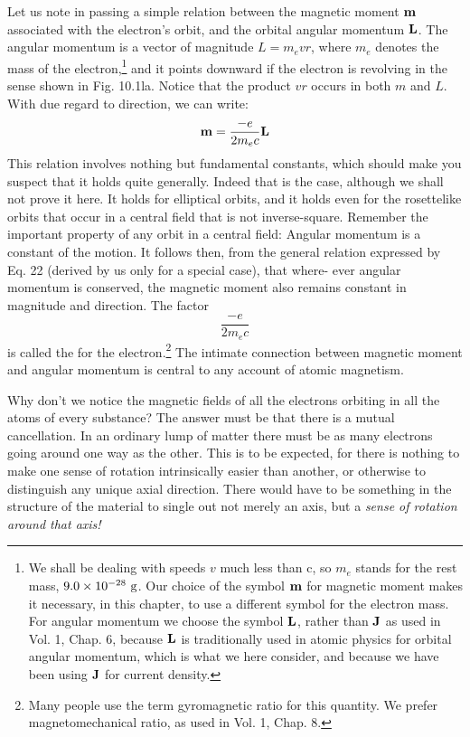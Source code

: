 Let us note in passing a simple relation between the magnetic
moment $\mathbf{m}$ associated with the electron's orbit, and the orbital angular
momentum $\mathbf{L}$. The angular momentum is a vector of magnitude
$L = m_evr$, where $m_e$ denotes the mass of the 
electron,\footnote{We shall be dealing with
speeds $v$ much less than c, so $m_e$ stands for the rest mass,
$9.0\times10^{-28}\ \zu{g}$. Our choice of the symbol $\mathbf{m}$ for magnetic moment makes it 
necessary, in this chapter, to use a different symbol for the electron mass. For angular
momentum we choose the symbol $\mathbf{L}$, rather than $\mathbf{J}$ as used in Vol. 1, Chap. 6, because
$\mathbf{L}$ is traditionally used in atomic physics for orbital angular momentum, which is what
we here consider, and because we have been using $\mathbf{J}$ for 
current density.} and it points
downward if the electron is revolving in the sense shown in
Fig. 10.1la. Notice that the product $vr$ occurs in both $m$ and $L$.
With due regard to direction, we can write:
\begin{equation}
  \mathbf{m} = \frac{-e}{2m_ec}\mathbf{L}
\end{equation}
This relation involves nothing but fundamental constants, which
should make you suspect that it holds quite generally. Indeed that
is the case, although we shall not prove it here. It holds for elliptical
orbits, and it holds even for the rosettelike orbits that occur in a
central field that is not inverse-square. Remember the important
property of any orbit in a central field: Angular momentum is a constant
of the motion. It follows then, from the general relation expressed
by Eq. 22 (derived by us only for a special case), that where-
ever angular momentum is conserved, the magnetic moment also
remains constant in magnitude and direction. The factor
\begin{equation}
  \frac{-e}{2m_ec}
\end{equation}
is called the 
for the electron.\footnote{Many people use the term gyromagnetic ratio for this quantity. We prefer 
magnetomechanical ratio, as used in Vol. 1, Chap. 8.} The
intimate connection between magnetic moment and angular momentum
is central to any account of atomic magnetism.

Why don't we notice the magnetic fields of all the electrons orbiting
in all the atoms of every substance? The answer must be that
there is a mutual cancellation. In an ordinary lump of matter there
must be as many electrons going around one way as the other. This
is to be expected, for there is nothing to make one sense of rotation
intrinsically easier than another, or otherwise to distinguish any
unique axial direction. There would have to be something in the
structure of the material to single out not merely an axis, but a \emph{sense
of rotation around that axis!}

